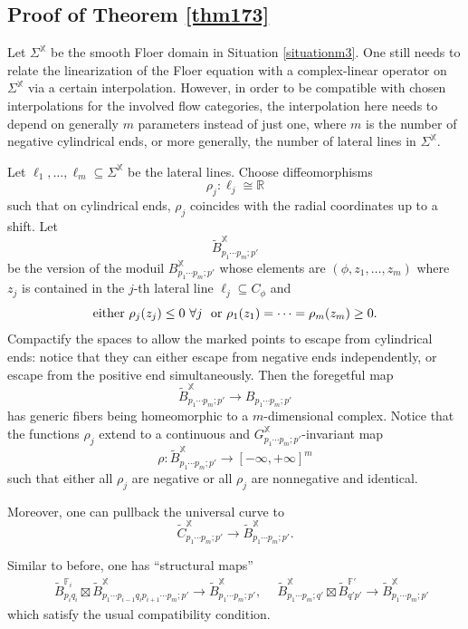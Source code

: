 \documentclass[reqno, 10pt]{amsart}
\numberwithin{equation}{section}
\numberwithin{equation}{section}
\renewcommand{\subset}{\subseteq}
\theoremstyle{definition}
\theoremstyle{remark}
\newcommand{\beqn}{\begin{equation*}}
\newcommand{\eeqn}{\end{equation*}}
\newcommand{\mb}{\mathbb}
\newcommand{\wt}{\widetilde}
\begin{document}
\subsection{Proof of Theorem \ref{thm173}}\label{subsection174}

Let $\Sigma^{\mb X}$ be the smooth Floer domain in Situation \ref{situationm3}. One still needs to relate the linearization of the Floer equation with a complex-linear operator on $\Sigma^{\mb X}$ via a certain interpolation. However, in order to be compatible with chosen interpolations for the involved flow categories, the interpolation here needs to depend on generally $m$ parameters instead of just one, where $m$ is the number of negative cylindrical ends, or more generally, the number of lateral lines in $\Sigma^{\mb X}$.

Let $\ell_1, \ldots, \ell_m \subset \Sigma^{\mb X}$ be the lateral lines. Choose diffeomorphisms
\beqn
\rho_j: \ell_j \cong {\mb R}
\eeqn
such that on cylindrical ends, $\rho_j$ coincides with the radial coordinates up to a shift. Let 
\beqn
\wt B_{p_1 \cdots p_m; p'}^{\mb X}
\eeqn
be the version of the moduil $B_{p_1 \cdots p_m; p'}^{\mb X}$ whose elements are $(\phi, z_1, \ldots, z_m)$ where $z_j$ is contained in the $j$-th lateral line $\ell_j \subset C_\phi$ and
\beqn
{\rm either}\ \rho_j(z_j) \leq 0\ \forall j\ \ {\rm or}\ \rho_1(z_1) = \cdots = \rho_m (z_m) \geq 0.
\eeqn
Compactify the spaces to allow the marked points to escape from cylindrical ends: notice that they can either escape from negative ends independently, or escape from the positive end simultaneously. Then the foregetful map
\beqn
\wt B_{p_1 \cdots p_m; p'}^{\mb X} \to B_{p_1 \cdots p_m; p'}
\eeqn
has generic fibers being homeomorphic to a $m$-dimensional complex. Notice that the functions $\rho_j$ extend to a continuous and $G_{p_1\cdots p_m; p'}^{\mb X}$-invariant map
\beqn
\rho: \wt B_{p_1 \cdots p_m; p'}^{\mb X} \to [-\infty, +\infty]^m
\eeqn
such that either all $\rho_j$ are negative or all $\rho_j$ are nonnegative and identical.

Moreover, one can pullback the universal curve to 
\beqn
\wt C_{p_1 \cdots p_m; p'}^{\mb X} \to \wt B_{p_1 \cdots p_m; p'}^{\mb X}.
\eeqn

Similar to before, one has ``structural maps''
\begin{align*}
&\ \wt B_{p_i q_i}^{{\mb F}_i} \boxtimes \wt B_{p_1 \cdots p_{i-1} q_i p_{i+1}\cdots p_m; p'}^{\mb X} \to \wt B_{p_1 \cdots p_m; p'}^{\mb X},\ &\ \wt B_{p_1 \cdots p_m; q'}^{\mb X}\boxtimes \wt B_{q' p'}^{{\mb F}'} \to \wt B_{p_1 \cdots p_m; p'}^{\mb X}
\end{align*}
which satisfy the usual compatibility condition. 
\end{document}
